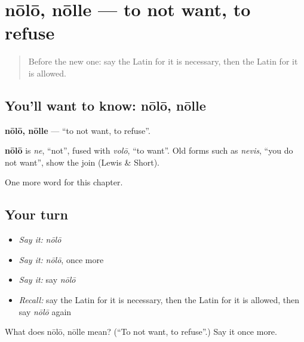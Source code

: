 \section[nōlō, nōlle]{nōlō, nōlle — to not want, to refuse}

\label{lesson:LA-C110-nolo}



\begin{quote}
Before the new one: say the Latin for it is necessary, then the Latin for it is allowed.
\end{quote}

\subsection*{You'll want to know: nōlō, nōlle}
\textbf{nōlō, nōlle} — \textquotedblleft{}to not want, to refuse\textquotedblright{}.

\begin{cousinweb}
\textbf{nōlō} is \emph{ne}, \textquotedblleft{}not\textquotedblright{}, fused with \emph{volō}, \textquotedblleft{}to want\textquotedblright{}. Old forms such as \emph{nevis}, \textquotedblleft{}you do not want\textquotedblright{}, show the join (Lewis \& Short).
\end{cousinweb}

\begin{grammarlens}[title={What you've built}]
One more word for this chapter.
\end{grammarlens}

\subsection*{Your turn}
\begin{itemize}
\raggedright
  \item \emph{Say it:} \emph{nōlō}
  \item \emph{Say it:} \emph{nōlō}, once more
  \item \emph{Say it:} say \emph{nōlō}
  \item \emph{Recall:} say the Latin for it is necessary, then the Latin for it is allowed, then say \emph{nōlō} again
\end{itemize}

\begin{tcolorbox}[breakable,colback=teal!4,colframe=teal!35!black,title={Before you move on}]
What does nōlō, nōlle mean? (\textquotedblleft{}To not want, to refuse\textquotedblright{}.) Say it once more.
\end{tcolorbox}
